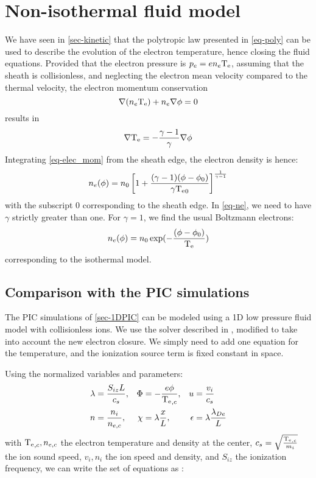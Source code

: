 
\section{Non-isothermal  fluid model }
\label{sec-fluid}

We have seen in \cref{sec-kinetic} that the polytropic law presented in \cref{eq-poly} can be used to describe the evolution of the electron temperature, hence closing the fluid equations.
Provided that the electron pressure is $p_e = e n_e \mathrm{T_e}$, assuming that the sheath is collisionless, and neglecting the electron mean velocity compared to the thermal velocity, the electron momentum conservation
\begin{equation}
\label{eq-elec_mom}
 \nabla (n_e \mathrm{T_e}) + n_e \nabla \phi = 0
\end{equation}
results in
\begin{equation}
  \label{eq-momentum}
  \nabla \mathrm{T_e} = - \frac{\gamma - 1}{\gamma} \nabla \phi
\end{equation}
Integrating \cref{eq-elec_mom} from the sheath edge, the electron density is hence:
\begin{equation}
  \label{eq-ne}
  n_e(\phi) = n_0 \left[ 1 + \frac{(\gamma - 1) (\phi - \phi_0)}{\gamma \mathrm{T_e}_0}  \right]^{\frac{1}{\gamma - 1}}
\end{equation}
with the subscript $0$ corresponding to the sheath edge.
In \cref{eq-ne}, we need to have $\gamma$ strictly greater than one.
For $\gamma=1$, we find the usual Boltzmann electrons:
\begin{equation}
  n_e(\phi) = n_0 \exp( - \frac{ (\phi - \phi_0)}{\mathrm{T_e}})
\end{equation}
corresponding to the isothermal model.

\subsection{Comparison with the PIC simulations}
\label{sec-fluidPIC}
The PIC simulations of \cref{sec-1DPIC} can be modeled using a 1D low pressure fluid model with collisionless ions.
We use the solver described in \citet{riemann2005}, modified to take into account the new electron closure.
We simply need to add one equation for the temperature, and the ionization source term is fixed constant in space.

Using the normalized variables and parameters:
\begin{align}
\lambda &= \frac{S_{iz} L}{c_s}, &\Phi&=-\frac{e \phi}{\mathrm{T_e}_{, c}}, &u &= \frac{v_i}{c_s}\\
n &= \frac{n_i}{n_{e,c}}, &\chi&=\lambda \frac{x}{L}, &\epsilon &= \lambda \frac{\lambda_{De}}{L}\\
\end{align}
with $\mathrm{T_e}_{,c}, n_{e,c}$ the electron temperature and density at the center, $c_s= \sqrt{\frac{\mathrm{T_e}_{,c}}{m_i}}$ the ion sound speed, $v_i, n_i$ the ion speed and density, and $S_{iz}$ the ionization frequency, we can write the set of equations as \citep{riemann2005}:



